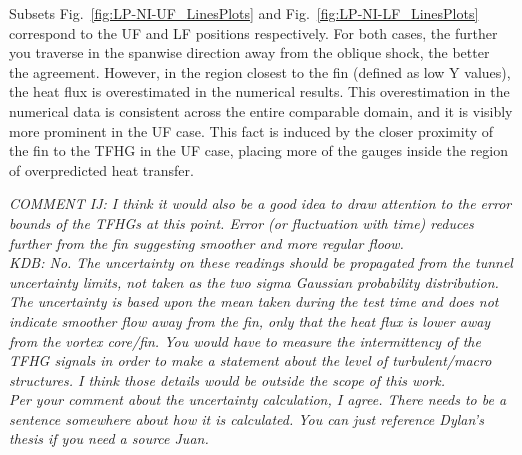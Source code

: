 \documentclass{AIAA}
\begin{document}
Subsets Fig.~\ref{fig:LP-NI-UF_LinesPlots} and Fig.~\ref{fig:LP-NI-LF_LinesPlots} correspond to the UF and LF positions respectively.
For both cases, the further you traverse in the spanwise direction away from the oblique shock, the better the agreement.
However, in the region closest to the fin (defined as low Y values), the heat flux is overestimated in the numerical results.
This overestimation in the numerical data is consistent across the entire comparable domain, and it is visibly more prominent in the UF case.
This fact is induced by the closer proximity of the fin to the TFHG in the UF case, placing more of the gauges inside the region of overpredicted heat transfer. 

{\it COMMENT IJ: I think it would also be a good idea to draw attention to the error bounds of the TFHGs at this point. Error (or fluctuation with time) reduces further from the fin suggesting smoother and more regular floow.}
\hfill\\
{\it KDB: No. The uncertainty on these readings should be propagated from the tunnel uncertainty limits, not taken as the two sigma Gaussian probability distribution. The uncertainty is based upon the mean taken during the test time and does not indicate smoother flow away from the fin, only that the heat flux is lower away from the vortex core/fin. You would have to measure the intermittency of the TFHG signals in order to make a statement about the level of turbulent/macro structures. I think those details would be outside the scope of this work.
\hfill\\
Per your comment about the uncertainty calculation, I agree. There needs to be a sentence somewhere about how it is calculated. You can just reference Dylan's thesis if you need a source Juan.
}
\end{document}
